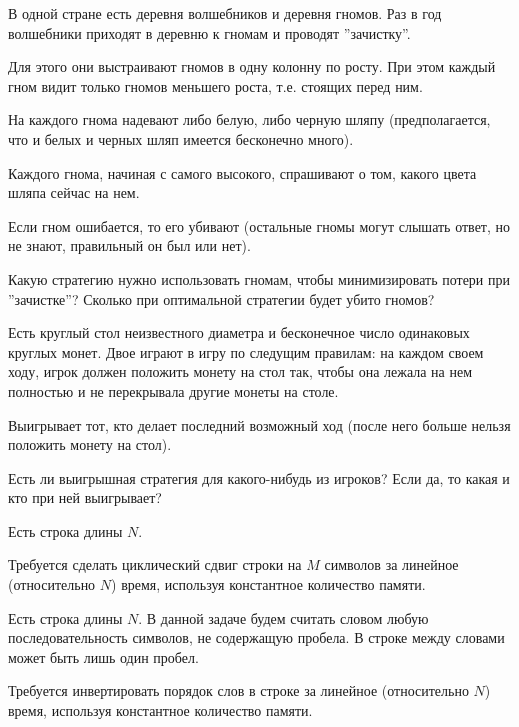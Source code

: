 \begin{problem}

В одной стране есть деревня волшебников и деревня гномов.
Раз в год волшебники приходят в деревню к гномам и проводят ''зачистку''.

Для этого они выстраивают гномов в одну колонну по росту. При этом каждый гном видит только гномов меньшего роста, т.е. стоящих перед ним. 

На каждого гнома надевают либо белую, либо черную шляпу (предполагается, что и белых и черных шляп имеется бесконечно много).

Каждого гнома, начиная с самого высокого, спрашивают о том, какого цвета шляпа сейчас на нем.

Если гном ошибается, то его убивают (остальные гномы могут слышать ответ, но не знают, правильный он был или нет).

Какую стратегию нужно использовать гномам, чтобы минимизировать потери при ''зачистке''?
Сколько при оптимальной стратегии будет убито гномов?

\end{problem}
\begin{problem}

Есть круглый стол неизвестного диаметра и бесконечное число одинаковых круглых монет. Двое играют в игру по следущим правилам: на каждом своем ходу, игрок должен положить монету на стол так, чтобы она лежала на нем полностью и не перекрывала другие монеты на столе.

Выигрывает тот, кто делает последний возможный ход (после него больше нельзя положить монету на стол). 

Есть ли выигрышная стратегия для какого-нибудь из игроков?
Если да, то какая и кто при ней выигрывает?

\end{problem}
\begin{problem}

Есть строка длины $N$.

Требуется сделать циклический сдвиг строки на $M$ символов за линейное (относительно $N$) время, используя константное количество памяти.

\end{problem}
\begin{problem}

Есть строка длины $N$. В данной задаче будем считать словом любую последовательность символов, не содержащую пробела. В строке между словами может быть лишь один пробел.

Требуется инвертировать порядок слов в строке за линейное (относительно $N$) время, используя константное количество памяти.

\end{problem}

